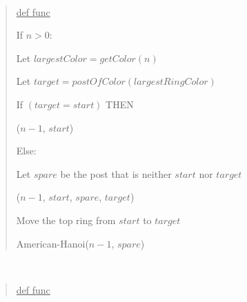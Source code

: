 \documentclass[10pt]{article}
\begin{document}
\begin{solution}\ %
\begin{quote}
\noindent\ul{def func }%

%

\begin{steps}
  \item If \( n > 0 \):
  \begin{steps}
    \item Let \( largestColor = getColor(n) \)
    \item Let \( target = postOfColor(largestRingColor) \)
    \item If \( (target = start) \) THEN
      \begin{steps}
      \item {}(\( n-1 \), \( start \))
      \end{steps}
    \item Else:
    \begin{steps}
      \item Let \( spare \) be the post that is neither \( start \) nor \( target \)
      \item {}(\( n-1 \), \( start \), \( spare \), \( target \))

      \item Move the top ring from \( start \) to \( target \)
      \item American-Hanoi(\( n-1 \), \( spare \))
      \end{steps}
  \end{steps}
\end{steps}
\end{quote}
\nf{} \\
\begin{quote}
\noindent\ul{def func }%


\end{quote}
\end{solution}
\end{document}
